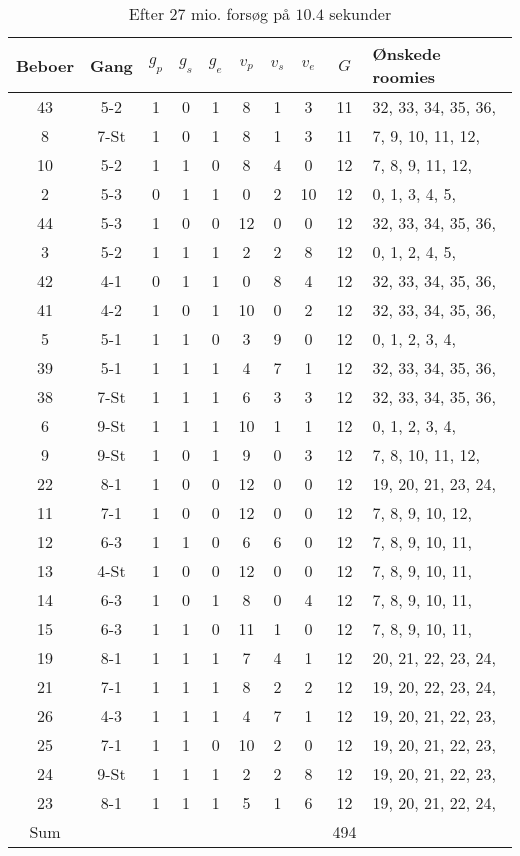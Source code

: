 \documentclass[article,oneside,11pt,a4paper]{memoir}
\newenvironment{assignment}[1]{
\begin{table}[h]
\caption{#1}
\footnotesize
\begin{center}
\begin{tabular}{cccccccccl}
\toprule
Beboer & Gang & $g_p$ & $g_s$ & $g_e$ & $v_p$ & $v_s$ & $v_e$ & $G$ & Ønskede roomies \\ \midrule
}{
\bottomrule
\end{tabular}
\end{center}
\end{table}

}
\begin{document}
\begin{assignment}{Efter 27 mio. forsøg på $10.4$ sekunder}
    43 & 5-2  &   1 &   0 &   1 &   8 &   1 &   3 & 11 &  32, 33, 34, 35, 36, \\
     8 & 7-St &   1 &   0 &   1 &   8 &   1 &   3 & 11 &   7,  9, 10, 11, 12, \\
    10 & 5-2  &   1 &   1 &   0 &   8 &   4 &   0 & 12 &   7,  8,  9, 11, 12, \\
     2 & 5-3  &   0 &   1 &   1 &   0 &   2 &  10 & 12 &   0,  1,  3,  4,  5, \\
    44 & 5-3  &   1 &   0 &   0 &  12 &   0 &   0 & 12 &  32, 33, 34, 35, 36, \\
     3 & 5-2  &   1 &   1 &   1 &   2 &   2 &   8 & 12 &   0,  1,  2,  4,  5, \\
    42 & 4-1  &   0 &   1 &   1 &   0 &   8 &   4 & 12 &  32, 33, 34, 35, 36, \\
    41 & 4-2  &   1 &   0 &   1 &  10 &   0 &   2 & 12 &  32, 33, 34, 35, 36, \\
     5 & 5-1  &   1 &   1 &   0 &   3 &   9 &   0 & 12 &   0,  1,  2,  3,  4, \\
    39 & 5-1  &   1 &   1 &   1 &   4 &   7 &   1 & 12 &  32, 33, 34, 35, 36, \\
    38 & 7-St &   1 &   1 &   1 &   6 &   3 &   3 & 12 &  32, 33, 34, 35, 36, \\
     6 & 9-St &   1 &   1 &   1 &  10 &   1 &   1 & 12 &   0,  1,  2,  3,  4, \\
     9 & 9-St &   1 &   0 &   1 &   9 &   0 &   3 & 12 &   7,  8, 10, 11, 12, \\
    22 & 8-1  &   1 &   0 &   0 &  12 &   0 &   0 & 12 &  19, 20, 21, 23, 24, \\
    11 & 7-1  &   1 &   0 &   0 &  12 &   0 &   0 & 12 &   7,  8,  9, 10, 12, \\
    12 & 6-3  &   1 &   1 &   0 &   6 &   6 &   0 & 12 &   7,  8,  9, 10, 11, \\
    13 & 4-St &   1 &   0 &   0 &  12 &   0 &   0 & 12 &   7,  8,  9, 10, 11, \\
    14 & 6-3  &   1 &   0 &   1 &   8 &   0 &   4 & 12 &   7,  8,  9, 10, 11, \\
    15 & 6-3  &   1 &   1 &   0 &  11 &   1 &   0 & 12 &   7,  8,  9, 10, 11, \\
    19 & 8-1  &   1 &   1 &   1 &   7 &   4 &   1 & 12 &  20, 21, 22, 23, 24, \\
    21 & 7-1  &   1 &   1 &   1 &   8 &   2 &   2 & 12 &  19, 20, 22, 23, 24, \\
    26 & 4-3  &   1 &   1 &   1 &   4 &   7 &   1 & 12 &  19, 20, 21, 22, 23, \\
    25 & 7-1  &   1 &   1 &   0 &  10 &   2 &   0 & 12 &  19, 20, 21, 22, 23, \\
    24 & 9-St &   1 &   1 &   1 &   2 &   2 &   8 & 12 &  19, 20, 21, 22, 23, \\
    23 & 8-1  &   1 &   1 &   1 &   5 &   1 &   6 & 12 &  19, 20, 21, 22, 24, \\
Sum &&&&&&&& 494 & \\
\end{assignment}
\end{document}
